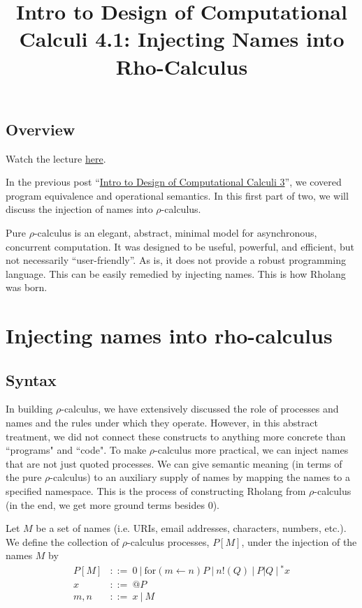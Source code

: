 \documentclass[12pt]{article}
\numberwithin{equation}{section}
\begin{document}
\author{}
\date{}
\title{Intro to Design of Computational Calculi 4.1: Injecting Names into Rho-Calculus}

\maketitle

\subsection{Overview}
Watch the lecture \href{https://www.youtube.com/watch?v=xGv_DykPNHA \& t=3050s}{here}.

In the previous post ``\href{https://www.rchain.coop/blog/intro-doc-3/}{Intro to Design of Computational Calculi 3}'', we covered program equivalence and operational semantics. In this first part of two, we will discuss the injection of names into $\rho$-calculus.

Pure $\rho$-calculus is an elegant, abstract, minimal model for asynchronous, concurrent computation. It was designed to be useful, powerful, and efficient, but not necessarily ``user-friendly''.  As is, it does not provide a robust programming language. This can be easily remedied by injecting names. This is how Rholang was born.


\section{Injecting names into rho-calculus}

\subsection{Syntax}
In building $\rho$-calculus, we have extensively discussed the role of processes and names and the rules under which they operate. However, in this abstract treatment, we did not connect these constructs to anything more concrete than ``programs" and ``code". To make $\rho$-calculus more practical, we can inject names that are not just quoted processes. We can give semantic meaning (in terms of the pure $\rho$-calculus) to an auxiliary supply of names by mapping the names to a specified namespace. This is the process of constructing Rholang from $\rho$-calculus (in the end, we get more ground terms besides $0$).

Let $M$ be a set of names (i.e. URIs, email addresses, characters, numbers, etc.). We define the collection of $\rho$-calculus processes, $P[M]$, under the injection of the names $M$ by
\begin{equation*}
\begin{split}
P[M] &::= \ 0 \ | \ \text{for}(m \leftarrow n)P \ | \ n!(Q) \ | \ P|Q \ | \ {}^*x \\
x &::= \ @P \\
m,n &::= \ x \ | \ M
\end{split}
\end{equation*}
\end{document}
